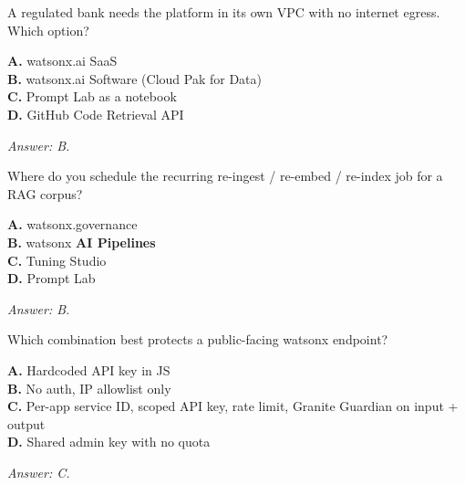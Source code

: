 \begin{practicebox}[title=\textbf{Q5.5 --- SaaS vs Software}]
A regulated bank needs the platform in its own VPC with no internet egress. Which option?

\textbf{A.} watsonx.ai SaaS\\
\textbf{B.} watsonx.ai Software (Cloud Pak for Data)\\
\textbf{C.} Prompt Lab as a notebook\\
\textbf{D.} GitHub Code Retrieval API

\vspace{0.2cm}\textit{Answer: B.}
\end{practicebox}

\begin{practicebox}[title=\textbf{Q5.6 --- Corpus refresh}]
Where do you schedule the recurring re-ingest / re-embed / re-index job for a RAG corpus?

\textbf{A.} watsonx.governance\\
\textbf{B.} watsonx \textbf{AI Pipelines}\\
\textbf{C.} Tuning Studio\\
\textbf{D.} Prompt Lab

\vspace{0.2cm}\textit{Answer: B.}
\end{practicebox}

\begin{practicebox}[title=\textbf{Q5.7 --- Endpoint security}]
Which combination best protects a public-facing watsonx endpoint?

\textbf{A.} Hardcoded API key in JS\\
\textbf{B.} No auth, IP allowlist only\\
\textbf{C.} Per-app service ID, scoped API key, rate limit, Granite Guardian on input + output\\
\textbf{D.} Shared admin key with no quota

\vspace{0.2cm}\textit{Answer: C.}
\end{practicebox}

\cleardoublepage
